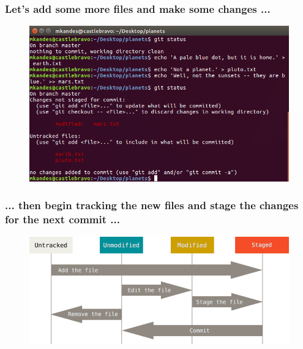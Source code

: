 \documentclass{beamer}
\begin{document}
\begin{frame}
   \frametitle{Let's add some more files and make some changes ...}
   \begin{figure}[htbp]
      \includegraphics[width=1.0\textwidth]{images/git-adding-more-files-and-some-changes.png}
   \end{figure}
\end{frame}

\begin{frame}
   \frametitle{... then begin tracking the new files and stage the changes for the next commit ...}
   \begin{figure}[htbp]
      \includegraphics[width=1.0\textwidth]{images/git-file-lifecycle.png}
   \end{figure}
\end{frame}
\end{document}
